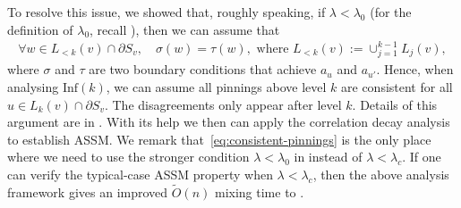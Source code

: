 \documentclass[11pt]{amsart}
\def\-#1{\mathrm{#1}}
\newcommand{\defeq}{:=}
\newcommand{\DTV}[2]{\-D_{\mathrm{TV}}\left({#1},{#2}\right)}
\theoremstyle{definition}
\theoremstyle{remark}
\begin{document}
To resolve this issue, we showed that, roughly speaking, if $\lambda < \lambda_0$ (for the definition of $\lambda_0$, recall ), then we can assume that 
\begin{align}\label{eq:consistent-pinnings}
  \forall w \in L_{<k}(v) \cap \partial S_v, \quad \sigma(w) = \tau(w), \text{ where } L_{<k}(v) \defeq \cup_{j=1}^{k-1} L_j(v),
\end{align}
where $\sigma$ and $\tau$ are two boundary conditions that achieve $a_{u}$ and $a_{u'}$.
Hence, when analysing $\text{Inf}(k)$, we can assume all pinnings above level $k$ are consistent for all $u \in L_k(v) \cap \partial S_v$.
The disagreements only appear after level $k$.
Details of this argument are in .
With its help we then can apply the correlation decay analysis to establish ASSM. 
%
We remark that~\eqref{eq:consistent-pinnings} is the only place where we need to use the stronger condition $\lambda < \lambda_0$ in instead of $\lambda < \lambda_c$. 
%
If one can verify the typical-case ASSM property when $\lambda < \lambda_c$, then the above analysis framework gives an improved $\tilde{O}(n)$ mixing time to .



\end{document}
